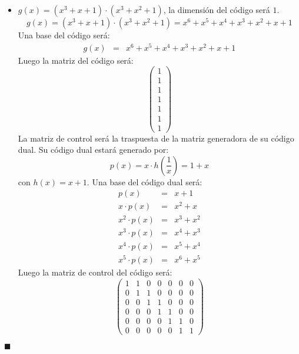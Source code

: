 \begin{itemize}
\item $g(x)=(x^3+x+1)\cdot (x^3+x^2+1)$, la dimensi\'on del c\'odigo ser\'a $1$.
\begin{displaymath}
g(x)=(x^3+x+1)\cdot(x^3+x^2+1)=x^6+x^5+x^4+x^3+x^2+x+1
\end{displaymath}
Una base del c\'odigo ser\'a:
\begin{eqnarray*}
g(x)&=&x^6+x^5+x^4+x^3+x^2+x+1
\end{eqnarray*}
Luego la matriz del c\'odigo ser\'a:
\begin{displaymath}
\left( \begin{array}{c}
1\\
1\\
1\\
1\\
1\\
1\\
1
\end{array} \right)
\end{displaymath}
La matriz de control ser\'a la traspuesta de la matriz generadora de su c\'odigo
dual. Su c\'odigo dual estar\'a generado por:
\begin{displaymath}
p(x)=x\cdot h(\frac{1}{x}) = 1+x
\end{displaymath}
con $h(x)=x+1$. Una base del c\'odigo dual ser\'a:
\begin{eqnarray*}
p(x)&=&x+1\\
x\cdot p(x)&=&x^2+x\\
x^2\cdot p(x)&=& x^3+x^2\\
x^3\cdot p(x)&=& x^4+x^3\\
x^4\cdot p(x)&=& x^5+x^4\\
x^5\cdot p(x)&=& x^6+x^5
\end{eqnarray*}
Luego la matriz de control del c\'odigo ser\'a:
\begin{displaymath}
\left( \begin{array}{ccccccc}
1&1&0&0&0&0&0\\
0&1&1&0&0&0&0\\
0&0&1&1&0&0&0\\
0&0&0&1&1&0&0\\
0&0&0&0&1&1&0\\
0&0&0&0&0&1&1
\end{array} \right)
\end{displaymath}
\end{itemize}
\begin{flushright}
$\blacksquare$
\end{flushright}
